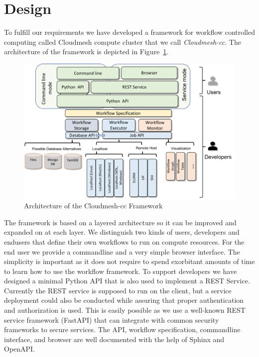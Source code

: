 
\section{Design}

To fulfill our requirements we have developed a framework for workflow
controlled computing called Cloudmesh compute cluster that we call
{\em Cloudmesh-cc}. The architecture of the framework is depicted in
Figure~\ref{fig:arch}.

\begin{figure}[htb]
\centering
\includegraphics[width=1.0\columnwidth]{images/cloudmesh-cc-arch.pdf}
\caption{Architecture of the Cloudmesh-cc Framework}\label{fig:arch}
\end{figure}

The framework is based on a layered architecture so it can be improved
and expanded on at each layer. We distinguish two kinds of users,
developers and endusers that define their own workflows to run on
compute resources. For the end user we provide a commandline and a
very simple browser interface. The simplicity is important as it does
not require to spend exorbitant amounts of time to learn how to use
the workflow framework. To support developers we have designed a
minimal Python API that is also used to implement a REST Service.
Currently the REST service is supposed to run on the client, but a
service deployment could also be conducted while assuring that proper
authentication and authorization is used. This is easily possible as
we use a well-known REST service framework (FastAPI) that can integrate
with common security frameworks to secure services. The API, workflow
specification, commandline interface, and browser are well documented
with the help of Sphinx and OpenAPI.

